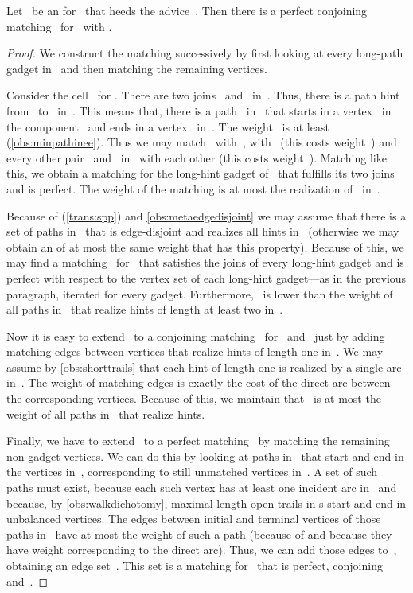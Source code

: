 \begin{lemma}
  \label{lem:redwmeeatocbmtransfer}
  Let~ be an \EE{} for~ that heeds the advice~. Then there is a perfect conjoining matching~ for~ with .
\end{lemma}
\begin{proof}
  We construct the matching successively by first looking at every long-path gadget in~ and then matching the remaining vertices.

  Consider the cell~ for . There are two joins~ and~ in~. Thus, there is a path hint~ from~ to~ in~. This means that, there is a path~ in~ that starts in a vertex~ in the component~ and ends in a vertex~ in~. The weight~ is at least~ (\autoref{obs:minpathinee}). Thus we may match~ with~,  with~ (this costs weight~) and every other pair~ and~ in~ with each other (this costs weight~). Matching like this, we obtain a matching for the long-hint gadget of~ that fulfills its two joins and is perfect. The weight of the matching is at most the realization of~ in~. 

Because of \SPP{} (\autoref{trans:spp}) and \autoref{obs:metaedgedisjoint} we may assume that there is a set of paths in~ that is edge-disjoint and realizes all hints in~ (otherwise we may obtain an \EE{} of at most the same weight that has this property). Because of this, we may find a matching~ for~ that satisfies the joins of every long-hint gadget and is perfect with respect to the vertex set of each long-hint gadget---as in the previous paragraph, iterated for every gadget. Furthermore,~ is lower than the weight of all paths in~ that realize hints of length at least two in~. 

Now it is easy to extend~ to a conjoining matching~ for~ and~ just by adding matching edges between vertices that realize hints of length one in~. We may assume by \autoref{obs:shorttrails} that each hint of length one is realized by a single arc in~. The weight of matching edges is exactly the cost of the direct arc between the corresponding vertices. Because of this, we maintain that ~is at most the weight of all paths in~ that realize hints. 

Finally, we have to extend~ to a perfect matching~ by matching the remaining non-gadget vertices. We can do this by looking at paths in~ that start and end in the vertices in~, corresponding to still unmatched vertices in~. A set of such paths must exist, because each such vertex has at least one incident arc in~ and because, by \autoref{obs:walkdichotomy}, maximal-length open trails in \EE s start and end in unbalanced vertices. The edges between initial and terminal vertices of those paths in~ have at most the weight of such a path (because of \SPP{} and because they have weight corresponding to the direct arc). Thus, we can add those edges to~, obtaining an edge set~. This set is a matching for~ that is perfect, conjoining and~.
\end{proof}
